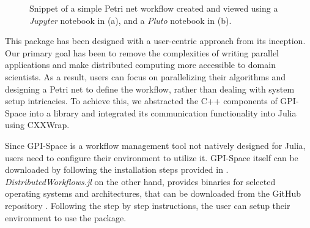 \documentclass{juliacon}
\begin{document}
\begin{figure}[h]
    \centering
    \label{notebook_examples}
    \caption{Snippet of a simple Petri net workflow created and viewed using a \emph{Jupyter} notebook in (a), and a \emph{Pluto} notebook in (b).}
\end{figure}


This package has been designed with a user-centric approach from its inception.
Our primary goal has been to remove the complexities of writing parallel applications and make distributed computing more accessible to domain scientists.
As a result, users can focus on parallelizing their algorithms and designing a Petri net to define the workflow, rather than dealing with system setup intricacies. 
To achieve this, we abstracted the C++ components of GPI-Space into a library and integrated its communication functionality into Julia using CXXWrap\cite{cxxwrap}.\vskip 6pt

Since GPI-Space is a workflow management tool not natively designed for Julia, users need to configure their environment to utilize it.
GPI-Space itself can be downloaded by following the installation steps provided in \cite{GSPC}.
\emph{DistributedWorkflows.jl} on the other hand, provides binaries for selected operating systems and architectures, that can be downloaded from the GitHub repository \cite{DistributedWorkflows}.
Following the step by step instructions, the user can setup their environment to use the package.\vskip 6pt
\end{document}
